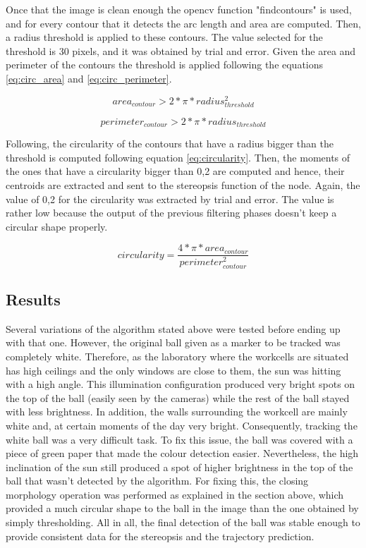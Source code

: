 Once that the image is clean enough the opencv function "findcontours" is used, and for every contour that it detects the arc length and area are computed. Then, a radius threshold is applied to these contours. The value selected for the threshold is 30 pixels, and it was obtained by trial and error. Given the area and perimeter of the contours the threshold is applied following the equations \ref{eq:circ_area} and \ref{eq:circ_perimeter}.

\begin{equation}
area_{contour}>2*\pi*radius_{threshold}^{2}
\label{eq:circ_area}
\end{equation}

\begin{equation}
perimeter_{contour}>2*\pi*radius_{threshold}
\label{eq:circ_perimeter}
\end{equation}

Following, the circularity of the contours that have a radius bigger than the threshold is computed following equation \ref{eq:circularity}. Then, the moments of the ones that have a circularity bigger than 0,2 are computed and hence, their centroids are extracted and sent to the stereopsis function of the node. Again, the value of 0,2 for the circularity was extracted by trial and error. The value is rather low because the output of the previous filtering phases doesn't keep a circular shape properly.

\begin{equation}
circularity=\frac{4*\pi*area_{contour}}{perimeter_{contour}^{2}}
\label{eq:circularity}
\end{equation}

\subsection{Results}
Several variations of the algorithm stated above were tested before ending up with that one. However, the original ball given as a marker to be tracked was completely white. Therefore, as the laboratory where the workcells are situated has high ceilings and the only windows are close to them, the sun was hitting with a high angle. This illumination configuration produced very bright spots on the top of the ball (easily seen by the cameras) while the rest of the ball stayed with less brightness. In addition, the walls surrounding the workcell are mainly white and, at certain moments of the day very bright. Consequently, tracking the white ball was a very difficult task. To fix this issue, the ball was covered with a piece of green paper that made the colour detection easier. Nevertheless, the high inclination of the sun still produced a spot of higher brightness in the top of the ball that wasn't detected by the algorithm. For fixing this, the closing morphology operation was performed as explained in the section above, which provided a much circular shape to the ball in the image than the one obtained by simply thresholding.
All in all, the final detection of the ball was stable enough to provide consistent data for the stereopsis and the trajectory prediction.


